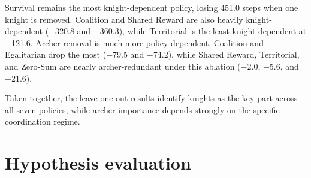 Survival remains the most knight-dependent policy, losing 451.0 steps when one knight is removed. Coalition and Shared Reward are also heavily knight-dependent ($-$320.8 and $-$360.3), while Territorial is the least knight-dependent at $-$121.6. Archer removal is much more policy-dependent. Coalition and Egalitarian drop the most ($-$79.5 and $-$74.2), while Shared Reward, Territorial, and Zero-Sum are nearly archer-redundant under this ablation ($-$2.0, $-$5.6, and $-$21.6).

Taken together, the leave-one-out results identify knights as the key part across all seven policies, while archer importance depends strongly on the specific coordination regime.


\section{Hypothesis evaluation}

